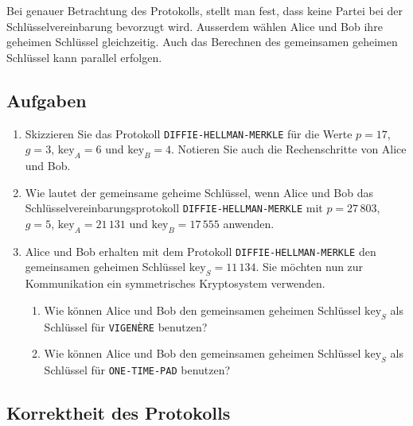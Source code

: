 Bei genauer Betrachtung des Protokolls, stellt man fest, dass keine Partei bei der Schlüsselvereinbarung bevorzugt wird. Ausserdem wählen Alice und Bob ihre geheimen Schlüssel gleichzeitig. Auch das Berechnen des gemeinsamen geheimen Schlüssel kann parallel erfolgen.

\subsection{Aufgaben}

\begin{enumerate}
	\item Skizzieren Sie das Protokoll \texttt{DIFFIE-HELLMAN-MERKLE} für die Werte $p = 17$, $g = 3$, $\text{key}_A = 6$ und $\text{key}_B = 4$. Notieren Sie auch die Rechenschritte von Alice und Bob.
	\item Wie lautet der gemeinsame geheime Schlüssel, wenn Alice und Bob das Schlüsselvereinbarungsprotokoll \texttt{DIFFIE-HELLMAN-MERKLE} mit $p = 27\,803$, $g = 5$, $\text{key}_A = 21\,131$ und $\text{key}_B = 17\,555$ anwenden.
	\item Alice und Bob erhalten mit dem Protokoll \texttt{DIFFIE-HELLMAN-MERKLE} den gemeinsamen geheimen Schlüssel $\text{key}_S = 11\,134$. Sie möchten nun zur Kommunikation ein symmetrisches Kryptosystem verwenden.
	\begin{enumerate}
		\item Wie können Alice und Bob den gemeinsamen geheimen Schlüssel $\text{key}_S$ als Schlüssel für \texttt{VIGENÈRE} benutzen?
		\item Wie können Alice und Bob den gemeinsamen geheimen Schlüssel $\text{key}_S$ als Schlüssel für \texttt{ONE-TIME-PAD} benutzen?
	\end{enumerate}
\end{enumerate}

\subsection{Korrektheit des Protokolls}

